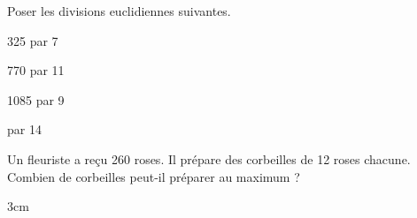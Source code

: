 \documentclass[a4paper]{book}
\begin{document}
    \begin{exemple}
        Poser les divisions euclidiennes suivantes.

        \medskip

        \begin{minipage}{0.24\linewidth}
            325 par 7
            
            \vspace{4cm}
        \end{minipage}
        \hfill
        \vline
        \hfill
        \begin{minipage}{0.24\linewidth}
            770 par 11 
             
            \vspace{4cm}
        \end{minipage}
        \hfill
        \vline
        \hfill
        \begin{minipage}{0.24\linewidth}
            1085 par 9
            
            \vspace{4cm}
        \end{minipage}
                \hfill
        \vline
        \hfill
        \begin{minipage}{0.24\linewidth}
             par 14
            
            \vspace{4cm}
        \end{minipage}
    \end{exemple}
    

    \begin{exemple}
        Un fleuriste a reçu 260 roses. Il prépare des corbeilles de 12 roses chacune. Combien de corbeilles peut-il préparer au maximum ?

        \begin{ZoneReponse}{3cm}
        \end{ZoneReponse}
    \end{exemple}


\newpage
\end{document}
